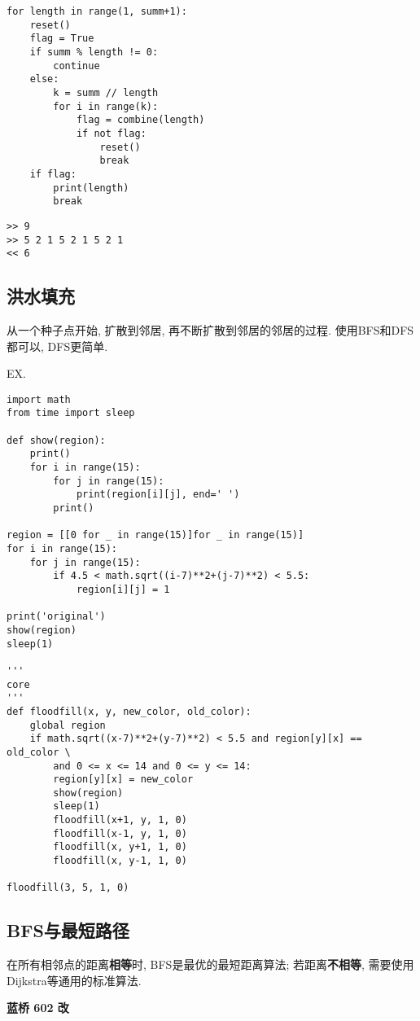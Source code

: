 \documentclass[../main]{subfiles}
\begin{document}
\begin{sloppy}
\begin{lstlisting}[style = Python]
for length in range(1, summ+1):
    reset()
    flag = True
    if summ % length != 0:
        continue
    else:
        k = summ // length
        for i in range(k):
            flag = combine(length)
            if not flag:
                reset()
                break
    if flag:
        print(length)
        break
\end{lstlisting}

\begin{verbatim}
>> 9
>> 5 2 1 5 2 1 5 2 1
<< 6
\end{verbatim}

\subsection{洪水填充}

从一个种子点开始, 扩散到邻居, 再不断扩散到邻居的邻居的过程. 使用BFS和DFS都可以, DFS更简单.

EX. 

\begin{lstlisting}[style = Python]
import math
from time import sleep

def show(region):
    print()
    for i in range(15):
        for j in range(15):
            print(region[i][j], end=' ')
        print()

region = [[0 for _ in range(15)]for _ in range(15)]
for i in range(15):
    for j in range(15):
        if 4.5 < math.sqrt((i-7)**2+(j-7)**2) < 5.5:
            region[i][j] = 1

print('original')
show(region)
sleep(1)

'''
core
'''
def floodfill(x, y, new_color, old_color):
    global region
    if math.sqrt((x-7)**2+(y-7)**2) < 5.5 and region[y][x] == old_color \
        and 0 <= x <= 14 and 0 <= y <= 14:
        region[y][x] = new_color
        show(region)
        sleep(1)
        floodfill(x+1, y, 1, 0)
        floodfill(x-1, y, 1, 0)
        floodfill(x, y+1, 1, 0)
        floodfill(x, y-1, 1, 0)

floodfill(3, 5, 1, 0)
\end{lstlisting}

\newpage
\subsection{BFS与最短路径}

在所有相邻点的距离\textbf{相等}时, BFS是最优的最短距离算法; 若距离\textbf{不相等}, 需要使用Dijkstra等通用的标准算法.

\textbf{蓝桥 602 改}


\end{sloppy}
\end{document}
